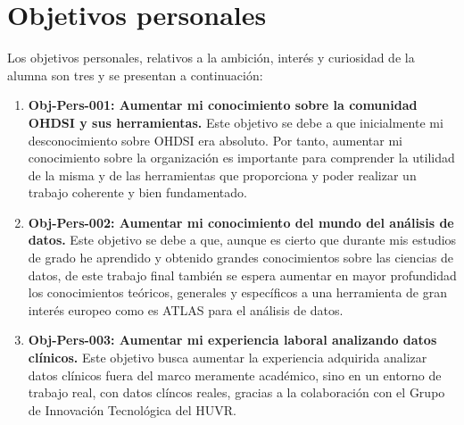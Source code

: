 \section{Objetivos personales} \label{sec:02objPersonal}

Los objetivos personales, relativos a la ambición, interés y curiosidad de la alumna son tres y se presentan a continuación:

%

\begin{enumerate}

    \item \textbf{Obj-Pers-001: Aumentar mi conocimiento sobre la comunidad OHDSI y sus herramientas.} Este objetivo se debe a que inicialmente mi desconocimiento sobre  OHDSI era absoluto. Por tanto, aumentar mi conocimiento sobre la organización es importante para comprender la utilidad de la misma y de las herramientas que proporciona y poder realizar un trabajo coherente y bien fundamentado.

    \item \textbf{Obj-Pers-002: Aumentar mi conocimiento del mundo del análisis de datos.} Este objetivo se debe a que, aunque es cierto que durante mis estudios de grado he aprendido y obtenido grandes conocimientos sobre las ciencias de datos, de este trabajo final también se espera aumentar en mayor profundidad los conocimientos teóricos, generales y específicos a una herramienta de gran interés europeo como es ATLAS para el análisis de datos.

    \item \textbf{Obj-Pers-003: Aumentar mi experiencia laboral analizando datos clínicos.} Este objetivo busca aumentar la experiencia adquirida analizar datos clínicos fuera del marco meramente académico, sino en un entorno de trabajo real, con datos clíncos reales, gracias a la colaboración con el Grupo de Innovación Tecnológica del HUVR.
    
\end{enumerate}



